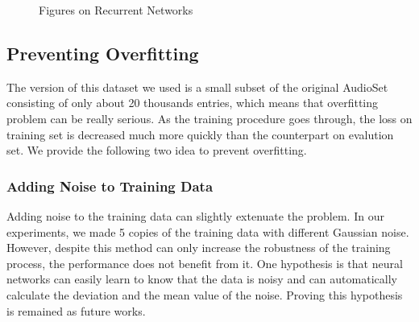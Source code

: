 \documentclass{article}
\begin{document}
				\begin{figure}[htbp]
					\centering
					\caption{\label{fig:rnn-proc}Figures on Recurrent Networks}
				\end{figure}
		\subsection{Preventing Overfitting}
			The version of this dataset we used is a small subset of the original AudioSet consisting of only about 20 thousands entries, which means that overfitting problem can be really serious. As the training procedure goes through, the loss on training set is decreased much more quickly than the counterpart on evalution set. We provide the following two idea to prevent overfitting.
			\subsubsection*{Adding Noise to Training Data}
				Adding noise to the training data can slightly extenuate the problem. In our experiments, we made 5 copies of the training data with different Gaussian noise. However, despite this method can only increase the robustness of the training process, the performance does not benefit from it. One hypothesis is that neural networks can easily learn to know that the data is noisy and can automatically calculate the deviation and the mean value of the noise. Proving this hypothesis is remained as future works.
\end{document}
